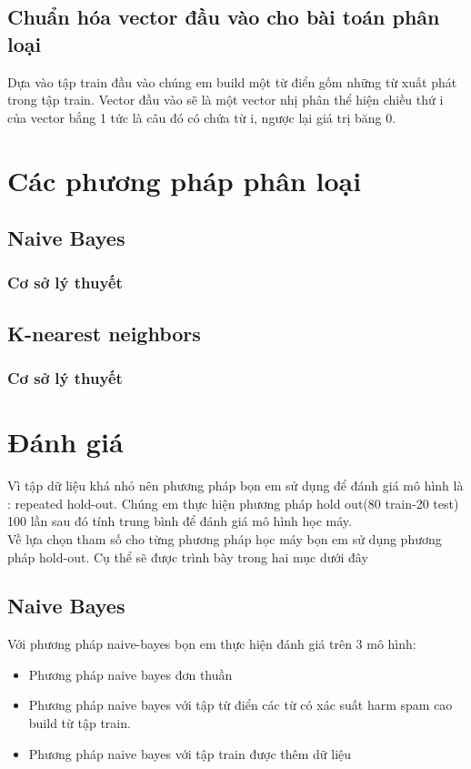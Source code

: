 \documentclass[a4paper,12pt]{report}
\begin{document}
\section{Chuẩn hóa vector đầu vào cho bài toán phân loại}
Dựa vào tập train đầu vào chúng em build một từ điển gốm những từ xuất phát trong tập train. Vector đầu vào sẽ là một vector nhị phân thể hiện chiều thứ i của vector bắng 1 tức là câu đó có chứa từ i, ngược lại giá trị băng 0.

\chapter{Các phương pháp phân loại}
\section{Naive Bayes}
\subsection{Cơ sở lý thuyết}
\section{K-nearest neighbors}
\subsection{Cơ sở lý thuyết}
\chapter{Đánh giá}
Vì tập dữ liệu khá nhỏ nên phương pháp bọn em sử dụng để đánh giá mô hình là : repeated hold-out. Chúng em thực hiện phương pháp hold out(80 train-20 test) 100 lần sau đó tính trung bình để đánh giá mô hình học máy.\\

Về lựa chọn tham số cho từng phương pháp học máy bọn em sử dụng phương pháp hold-out. Cụ thể sẽ được trình bày trong hai mục dưới đây
\section{Naive Bayes}
Với phương pháp naive-bayes bọn em thực hiện đánh giá trên 3 mô hình:
\begin{itemize}
\item Phương pháp naive bayes đơn thuần
\item Phương pháp naive bayes với tập từ điển các từ có xác suất harm spam cao build từ tập train.
\item Phương pháp naive bayes với tập train được thêm dữ liệu
\end{itemize}
\end{document}
